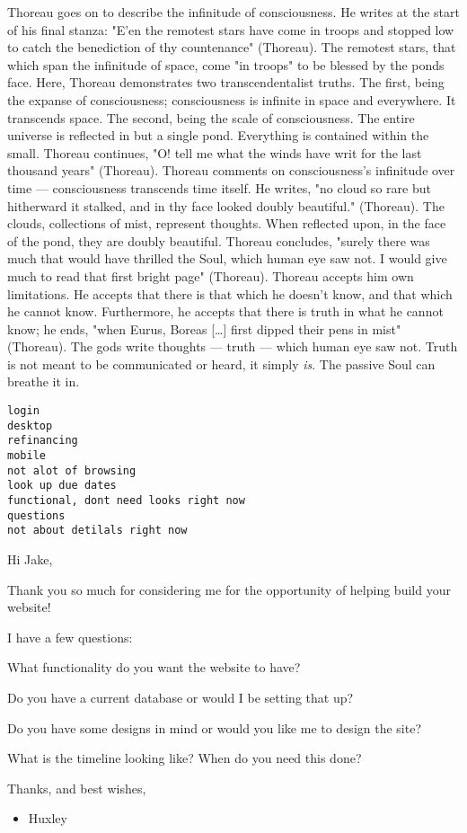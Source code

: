 \documentclass[letterpaper]{article}
\begin{document}
Thoreau goes on to describe the infinitude of consciousness. He writes
at the start of his final stanza: "E'en the remotest stars have come in
troops and stopped low to catch the benediction of thy countenance"
(Thoreau). The remotest stars, that which span the infinitude of space,
come "in troops" to be blessed by the ponds face. Here, Thoreau
demonstrates two transcendentalist truths. The first, being the expanse
of consciousness; consciousness is infinite in space and everywhere. It
transcends space. The second, being the scale of consciousness. The
entire universe is reflected in but a single pond. Everything is
contained within the small. Thoreau continues, "O! tell me what the
winds have writ for the last thousand years" (Thoreau). Thoreau comments
on consciousness's infinitude over time --- consciousness transcends
time itself. He writes, "no cloud so rare but hitherward it stalked, and
in thy face looked doubly beautiful." (Thoreau). The clouds, collections
of mist, represent thoughts. When reflected upon, in the face of the
pond, they are doubly beautiful. Thoreau concludes, "surely there was
much that would have thrilled the Soul, which human eye saw not. I would
give much to read that first bright page" (Thoreau). Thoreau accepts him
own limitations. He accepts that there is that which he doesn't know,
and that which he cannot know. Furthermore, he accepts that there is
truth in what he cannot know; he ends, "when Eurus, Boreas [\ldots{}] first
dipped their pens in mist" (Thoreau). The gods write thoughts --- truth
--- which human eye saw not. Truth is not meant to be communicated or
heard, it simply \emph{is}. The passive Soul can breathe it in.

\begin{verbatim}
login
desktop
refinancing
mobile
not alot of browsing
look up due dates
functional, dont need looks right now 
questions
not about detilals right now
\end{verbatim}

Hi Jake,

Thank you so much for considering me for the opportunity of helping
build your website!

I have a few questions:

What functionality do you want the website to have?

Do you have a current database or would I be setting that up?

Do you have some designs in mind or would you like me to design the
site?

What is the timeline looking like? When do you need this done?

Thanks, and best wishes,

\begin{itemize}
\item Huxley
\end{itemize}
\end{document}
